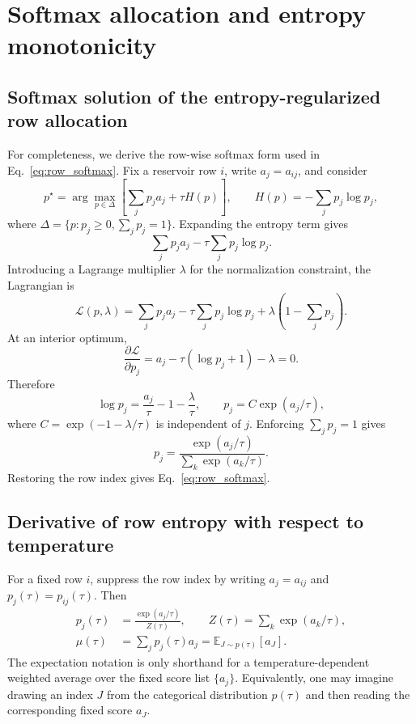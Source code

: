 \documentclass[preprint,12pt,authoryear]{elsarticle}
\begin{document}
\appendix
\section{Softmax allocation and entropy monotonicity}
\label{app:derivations}

\subsection{Softmax solution of the entropy-regularized row allocation}

For completeness, we derive the row-wise softmax form used in Eq.~\eqref{eq:row_softmax}. Fix a reservoir row $i$, write $a_j=a_{ij}$, and consider
\begin{equation}
  p^\star=\arg\max_{p\in\Delta}
  \left[\sum_j p_j a_j+\tau H(p)\right],
  \qquad
  H(p)=-\sum_j p_j\log p_j,
\end{equation}
where $\Delta=\{p:p_j\ge 0,\sum_jp_j=1\}$. Expanding the entropy term gives
\begin{equation}
  \sum_j p_j a_j-\tau\sum_j p_j\log p_j.
\end{equation}
Introducing a Lagrange multiplier $\lambda$ for the normalization constraint, the Lagrangian is
\begin{equation}
  \mathcal L(p,\lambda)=
  \sum_j p_j a_j-
  \tau\sum_jp_j\log p_j+
  \lambda\left(1-\sum_jp_j\right).
\end{equation}
At an interior optimum,
\begin{equation}
  \frac{\partial\mathcal L}{\partial p_j}
  =a_j-\tau(\log p_j+1)-\lambda=0.
\end{equation}
Therefore
\begin{equation}
  \log p_j=\frac{a_j}{\tau}-1-\frac{\lambda}{\tau},
  \qquad
  p_j=C\exp(a_j/\tau),
\end{equation}
where $C=\exp(-1-\lambda/\tau)$ is independent of $j$. Enforcing $\sum_jp_j=1$ gives
\begin{equation}
  p_j=\frac{\exp(a_j/\tau)}{\sum_k\exp(a_k/\tau)}.
\end{equation}
Restoring the row index gives Eq.~\eqref{eq:row_softmax}.

\subsection{Derivative of row entropy with respect to temperature}

For a fixed row $i$, suppress the row index by writing $a_j=a_{ij}$ and $p_j(\tau)=p_{ij}(\tau)$. Then
\begin{equation}
\begin{aligned}
  p_j(\tau)&=\frac{\exp(a_j/\tau)}{Z(\tau)},
  \qquad Z(\tau)=\sum_k\exp(a_k/\tau),\\
  \mu(\tau)&=\sum_j p_j(\tau)a_j=\mathbb E_{J\sim p(\tau)}[a_J].
\end{aligned}
\end{equation}
The expectation notation is only shorthand for a temperature-dependent weighted average over the fixed score list $\{a_j\}$. Equivalently, one may imagine drawing an index $J$ from the categorical distribution $p(\tau)$ and then reading the corresponding fixed score $a_J$.
\end{document}
